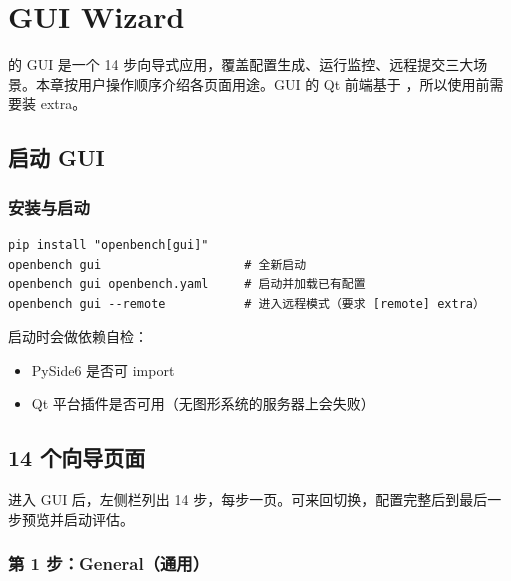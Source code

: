 
\chapter{GUI Wizard}

\openbench{} 的 GUI 是一个 14 步向导式应用，覆盖配置生成、运行监控、远程提交三大场景。本章按用户操作顺序介绍各页面用途。GUI 的 Qt 前端基于 ，所以使用前需要装 \cli{[gui]} extra。


\section{启动 GUI}

\subsection{安装与启动}

\begin{verbatim}
pip install "openbench[gui]"
openbench gui                    # 全新启动
openbench gui openbench.yaml     # 启动并加载已有配置
openbench gui --remote           # 进入远程模式（要求 [remote] extra）
\end{verbatim}

\openbench{} 启动时会做依赖自检：

\begin{itemize}
  \item PySide6 是否可 import
  \item Qt 平台插件是否可用（无图形系统的服务器上会失败）
\end{itemize}


\section{14 个向导页面}

进入 GUI 后，左侧栏列出 14 步，每步一页。可来回切换，配置完整后到最后一步预览并启动评估。

\subsection{第 1 步：General（通用）}

